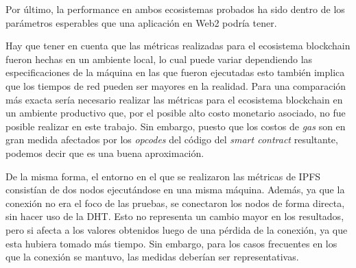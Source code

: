 Por último, la performance en ambos ecosistemas probados ha sido dentro de los parámetros esperables que una aplicación en Web2 podría tener.

Hay que tener en cuenta que las métricas realizadas para el ecosistema blockchain fueron hechas en un ambiente local, lo cual puede variar dependiendo las especificaciones de la máquina en las que fueron ejecutadas esto también implica que los tiempos de red pueden ser mayores en la realidad. Para una comparación más exacta sería necesario realizar las métricas para el ecosistema blockchain en un ambiente productivo que, por el posible alto costo monetario asociado, no fue posible realizar en este trabajo. Sin embargo, puesto que los costos de \textit{gas} son en gran medida afectados por los \textit{opcodes} del código del \textit{smart contract} resultante, podemos decir que es una buena aproximación.

De la misma forma, el entorno en el que se realizaron las métricas de IPFS consistían de dos nodos ejecutándose en una misma máquina. Además, ya que la conexión no era el foco de las pruebas, se conectaron los nodos de forma directa, sin hacer uso de la DHT. Esto no representa un cambio mayor en los resultados, pero si afecta a los valores obtenidos luego de una pérdida de la conexión, ya que esta hubiera tomado más tiempo. Sin embargo, para los casos frecuentes en los que la conexión se mantuvo, las medidas deberían ser representativas.